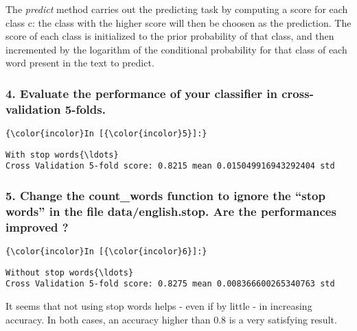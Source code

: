 \documentclass[11pt]{article}
\begin{document}
The \emph{predict} method carries out the predicting task by computing a
score for each class c: the class with the higher score will then be
choosen as the prediction. The score of each class is initialized to the
prior probability of that class, and then incremented by the logarithm
of the conditional probability for that class of each word present in
the text to predict.

    \subsubsection{4. Evaluate the performance of your classifier in
cross-validation
5-folds.}\label{evaluate-the-performance-of-your-classifier-in-cross-validation-5-folds.}

    \begin{Verbatim}[commandchars=\\\{\}]
{\color{incolor}In [{\color{incolor}5}]:} 
\end{Verbatim}


    \begin{Verbatim}[commandchars=\\\{\}]
With stop words{\ldots}
Cross Validation 5-fold score: 0.8215 mean 0.015049916943292404 std 

    \end{Verbatim}

    \subsubsection{5. Change the count\_words function to ignore the ``stop
words'' in the file data/english.stop. Are the performances improved
?}\label{change-the-count_words-function-to-ignore-the-stop-words-in-the-file-dataenglish.stop.-are-the-performances-improved}

    \begin{Verbatim}[commandchars=\\\{\}]
{\color{incolor}In [{\color{incolor}6}]:} 
\end{Verbatim}


    \begin{Verbatim}[commandchars=\\\{\}]
Without stop words{\ldots}
Cross Validation 5-fold score: 0.8275 mean 0.008366600265340763 std 

    \end{Verbatim}

    It seems that not using stop words helps - even if by little - in
increasing accuracy. In both cases, an accuracy higher than 0.8 is a
very satisfying result.
\end{document}
